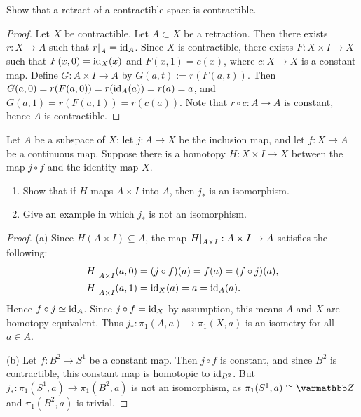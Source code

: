 \documentclass[10pt,oneside,openany]{memoir}
\begin{document}
\newpage
\begin{exercise}[manual-num={6}]
Show that a retract of a contractible space is contractible.
\end{exercise}
\begin{proof}
Let $X$ be contractible. Let $A \subset X$ be a retraction. Then there exists $r:X \rightarrow A$ such that $\restr{r}{A} = \id_A$. Since $X$ is contractible, there exists $F:X \times I \rightarrow X$ such that $F(x,0) = \operatorname{id}_X(x)$ and $F(x,1) = c(x)$, where $c:X \rightarrow X$ is a constant map. Define $G:A \times I \rightarrow A$ by $G(a,t) := r(F(a,t))$. Then $G(a,0) = r(F(a,0)) = r(\operatorname{id}_A(a)) = r(a) = a$, and $G(a,1) = r(F(a,1)) = r(c(a))$. Note that $r \circ c:A \rightarrow A$ is constant, hence $A$ is contractible. 
\end{proof}

\begin{exercise}[manual-num={7}]
Let $A$ be a subspace of $X$; let $j:A \rightarrow X$ be the inclusion map, and let $f:X \rightarrow A$ be a continuous map. Suppose there is a homotopy $H:X \times I \rightarrow X$ between the map $j \circ f$ and the identity map $X$.
\begin{enumerate}[label = (\alph*),itemsep=1pt,topsep=3pt]
	\item Show that if $H$ maps $A \times I$ into $A$, then $j_\ast$ is an isomorphism.
	\item Give an example in which $j_\ast$ is not an isomorphism.
\end{enumerate}
\end{exercise}
\begin{proof}
	(a) Since $H(A \times I) \subseteq A$, the map $\restr{H}{A \times I}:A \times I \rightarrow A$ satisfies the following:
		\begin{equation*}
		\begin{split}
			\restr{H}{A \times I}(a,0)&=(j \circ f)(a) = f(a) = (f \circ j)(a), \\
			\restr{H}{A \times I}(a,1)&=\id_X(a) = a = \id_A(a).
		\end{split}
		\end{equation*}
	Hence $f \circ j \simeq \operatorname{id}_A$. Since $j \circ f = \operatorname{id}_X$ by assumption, this means $A$ and $X$ are homotopy equivalent. Thus $j_\ast:\pi_1(A,a) \rightarrow \pi_1(X,a)$ is an isometry for all $a \in A$.

	(b) Let $f:B^2 \rightarrow S^1$ be a constant map. Then $j \circ f$ is constant, and since $B^2$ is contractible, this constant map is homotopic to $\operatorname{id}_{B^2}$. But $j_\ast:\pi_1(S^1,a) \rightarrow \pi_1(B^2,a)$ is not an isomorphism, as $\pi_1(S^1,a) \cong \bfZ$ and $\pi_1(B^2,a)$ is trivial.
\end{proof}
\end{document}
